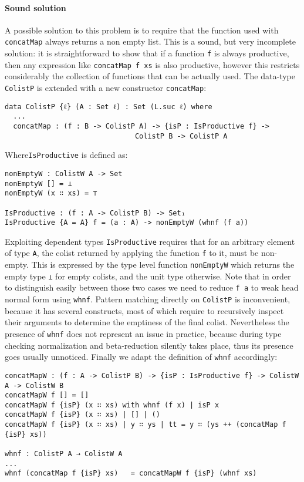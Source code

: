 \documentclass[10pt,a4paper]{article}
\begin{document}
\paragraph{Sound solution}
A possible solution to this problem is to require that the function used with \texttt{concatMap} always returns a non empty list.
This is a sound, but very incomplete solution: it is straightforward to show that if a function \texttt{f} is always productive, then any expression like \texttt{concatMap f xs} is also productive, however this restricts considerably the collection of functions that can be actually used.
The data-type \texttt{ColistP} is extended with a new constructor \texttt{concatMap}:
\begin{verbatim}
data ColistP {ℓ} (A : Set ℓ) : Set (L.suc ℓ) where
  ...
  concatMap : (f : B -> ColistP A) -> {isP : IsProductive f} -> 
  					           ColistP B -> ColistP A
\end{verbatim}
Where\texttt{IsProductive} is defined as:
\begin{verbatim}
nonEmptyW : ColistW A -> Set
nonEmptyW [] = ⊥
nonEmptyW (x ∷ xs) = ⊤

IsProductive : (f : A -> ColistP B) -> Set₁
IsProductive {A = A} f = (a : A) -> nonEmptyW (whnf (f a))
\end{verbatim}
Exploiting dependent types \texttt{IsProductive} requires that for an arbitrary
element of type \texttt{A}, the colist returned by applying the function \texttt{f} to it, must be non-empty. This is expressed by the type level function \texttt{nonEmptyW} which returns the empty type \texttt{⊥} for empty colists, and the unit type otherwise.
Note that in order to distinguish easily between those two cases we need to reduce \texttt{f a} to weak head normal form using \texttt{whnf}.
Pattern matching directly on \texttt{ColistP} is inconvenient, because it has several constructs, most of which require to recursively inspect their arguments to determine the emptiness of the final colist.
Nevertheless the presence of \texttt{whnf} does not represent an issue in practice, because during type checking normalization and beta-reduction silently takes place, thus its presence goes usually unnoticed.
Finally we adapt the definition of \texttt{whnf} accordingly:
\begin{verbatim}
concatMapW : (f : A -> ColistP B) -> {isP : IsProductive f} -> ColistW A -> ColistW B
concatMapW f [] = []
concatMapW f {isP} (x ∷ xs) with whnf (f x) | isP x
concatMapW f {isP} (x ∷ xs) | [] | ()
concatMapW f {isP} (x ∷ xs) | y ∷ ys | tt = y ∷ (ys ++ (concatMap f {isP} xs))

whnf : ColistP A → ColistW A
...
whnf (concatMap f {isP} xs)   = concatMapW f {isP} (whnf xs)
\end{verbatim}
\end{document}

